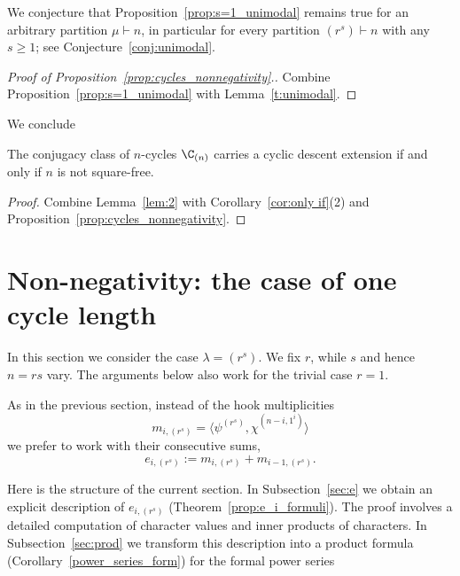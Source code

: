 \begin{remark}
	We conjecture that Proposition~\ref{prop:s=1_unimodal} remains true for an arbitrary partition $\mu \vdash n$, in particular for every partition $(r^s) \vdash n$ with any	$s\ge 1$; see Conjecture~\ref{conj:unimodal}.
\end{remark}

\begin{proof}[Proof of Proposition~\ref{prop:cycles_nonnegativity}.]
    Combine Proposition~\ref{prop:s=1_unimodal} with   Lemma~\ref{t:unimodal}.
\end{proof}

We conclude 

\begin{corollary}\label{prop:CDE_cycles}
    The conjugacy class of $n$-cycles $\C_{(n)}$ carries a cyclic descent extension if and only if $n$ is not square-free.
\end{corollary}
	 
\begin{proof} 
    Combine Lemma~\ref{lem:2} with Corollary~\ref{cor:only if}(2) and Proposition~\ref{prop:cycles_nonnegativity}. 
\end{proof}


\section{Non-negativity: the case of one cycle length}
\label{sec:Witt}

In this section we consider the case $\lambda = (r^s)$. 
We fix $r$, while $s$ and hence $n=rs$ vary. 
The arguments below also work for the trivial case $r=1$.
		
As in the previous section, instead of the hook multiplicities 
\[
    m_{i,(r^s)} 
    = \langle \psi^{(r^s)}, \chi^{(n-i,1^i)} \rangle
\]
we prefer to work with their consecutive sums,
\[
    e_{i,(r^s)} := m_{i,(r^s)} + m_{i-1,(r^s)}.
\]
		
Here is the structure of the current section.
In Subsection~\ref{sec:e} 
we obtain an explicit description of $e_{i,(r^s)}$ (Theorem~\ref{prop:e_i_formuli}). The proof involves a detailed computation of character values and inner products of characters.
In Subsection~\ref{sec:prod} we 
transform this description into
a product formula (Corollary~\ref{power_series_form})
for the formal power series 
